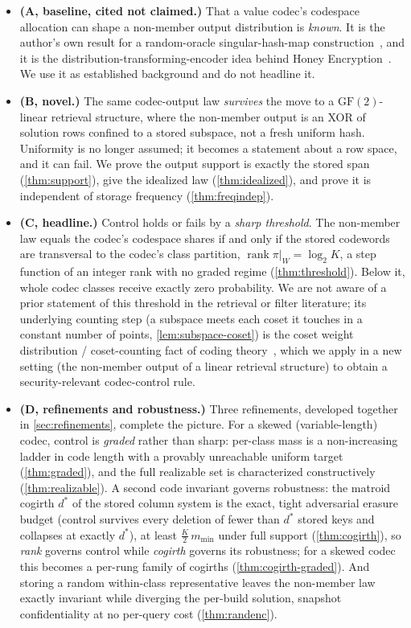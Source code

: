 \documentclass[acmsmall,review]{acmart}
\newcommand{\GF}{\mathrm{GF}(2)}
\DeclareMathOperator{\rank}{rank}
\newcommand{\W}{W}                          %
\newcommand{\proj}{\pi}                     %
\begin{document}
\begin{itemize}
  \item \textbf{(A, baseline, cited not claimed.)} That a value codec's codespace
  allocation can shape a non-member output distribution is \emph{known}. It is the
  author's own result for a random-oracle singular-hash-map
  construction~\cite{towell_bernoulli_maps}, and it is the
  distribution-transforming-encoder idea behind Honey
  Encryption~\cite{juels2014honey,cheng2019pmte}. We use it as established
  background and do not headline it.
  \item \textbf{(B, novel.)} The same codec-output law \emph{survives} the move to a
  $\GF$-linear retrieval structure, where the non-member output is an XOR of solution
  rows confined to a stored subspace, not a fresh uniform hash. Uniformity is no
  longer assumed; it becomes a statement about a row space, and it can fail. We prove
  the output support is exactly the stored span (\cref{thm:support}), give the
  idealized law (\cref{thm:idealized}), and prove it is independent of storage
  frequency (\cref{thm:freqindep}).
  \item \textbf{(C, headline.)} Control holds or fails by a \emph{sharp threshold}.
  The non-member law equals the codec's codespace shares if and only if the stored
  codewords are transversal to the codec's class partition, $\rank \proj|_{\W} =
  \log_2 K$, a step function of an integer rank with no graded regime
  (\cref{thm:threshold}). Below it, whole codec classes receive exactly zero
  probability. We are not aware of a prior statement of this threshold in the retrieval
  or filter literature; its underlying counting step (a subspace meets each coset it
  touches in a constant number of points, \cref{lem:subspace-coset}) is the coset weight
  distribution / coset-counting fact of coding theory~\cite{macwilliams1977}, which we
  apply in a new setting (the non-member output of a linear retrieval structure) to
  obtain a security-relevant codec-control rule.
  \item \textbf{(D, refinements and robustness.)} Three refinements, developed together in
  \cref{sec:refinements}, complete the picture. For a skewed (variable-length) codec,
  control is \emph{graded} rather than sharp: per-class mass is a non-increasing ladder in
  code length with a provably unreachable uniform target (\cref{thm:graded}), and the full
  realizable set is characterized constructively (\cref{thm:realizable}). A second code
  invariant governs robustness: the matroid cogirth $d^\ast$ of the stored column system is
  the exact, tight adversarial erasure budget (control survives every deletion of fewer than
  $d^\ast$ stored keys and collapses at exactly $d^\ast$), at least $\tfrac{K}{2}\,m_{\min}$
  under full support (\cref{thm:cogirth}), so \emph{rank} governs control while
  \emph{cogirth} governs its robustness; for a skewed codec this becomes a per-rung family
  of cogirths (\cref{thm:cogirth-graded}). And storing a random within-class representative
  leaves the non-member law exactly invariant while diverging the per-build solution,
  snapshot confidentiality at no per-query cost (\cref{thm:randenc}).
\end{itemize}
\end{document}

